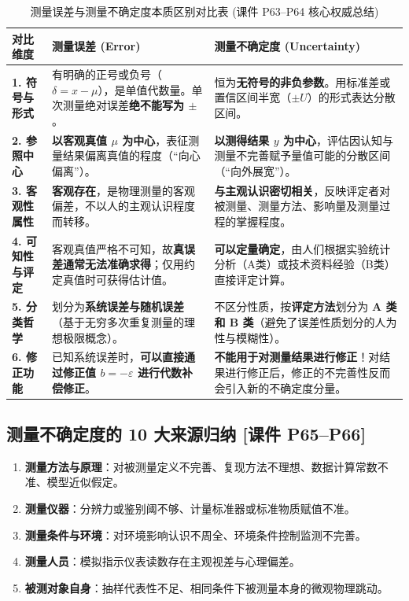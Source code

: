 \documentclass[11pt,a4paper]{ctexart}
\begin{document}
\begin{table}[htbp]
\centering
\small
\renewcommand{\arraystretch}{1.4}
\begin{tabularx}{\textwidth}{p{2.6cm}Xp{6.2cm}}
\toprule
\textbf{对比维度} & \textbf{测量误差 (Error)} & \textbf{测量不确定度 (Uncertainty)} \\
\midrule
\textbf{1. 符号与形式} & 有明确的正号或负号（$\delta = x - \mu$），是单值代数量。单次测量绝对误差\textbf{绝不能写为 $\pm$}。 & 恒为\textbf{无符号的非负参数}。用标准差或置信区间半宽（$\pm U$）的形式表达分散区间。 \\
\midrule
\textbf{2. 参照中心} & \textbf{以客观真值 $\mu$ 为中心}，表征测量结果偏离真值的程度（“向心偏离”）。 & \textbf{以测得结果 $y$ 为中心}，评估因认知与测量不完善赋予量值可能的分散区间（“向外展宽”）。 \\
\midrule
\textbf{3. 客观性属性} & \textbf{客观存在}，是物理测量的客观偏差，不以人的主观认识程度而转移。 & \textbf{与主观认识密切相关}，反映评定者对被测量、测量方法、影响量及测量过程的掌握程度。 \\
\midrule
\textbf{4. 可知性与评定} & 客观真值严格不可知，故\textbf{真误差通常无法准确求得}；仅用约定真值时可获得估计值。 & \textbf{可以定量确定}，由人们根据实验统计分析（A类）或技术资料经验（B类）直接评定计算。 \\
\midrule
\textbf{5. 分类哲学} & 划分为\textbf{系统误差与随机误差}（基于无穷多次重复测量的理想极限概念）。 & 不区分性质，按\textbf{评定方法}划分为 \textbf{A 类和 B 类}（避免了误差性质划分的人为性与模糊性）。 \\
\midrule
\textbf{6. 修正功能} & 已知系统误差时，\textbf{可以直接通过修正值 $b = -\varepsilon$ 进行代数补偿修正}。 & \textbf{不能用于对测量结果进行修正}！对结果进行修正后，修正的不完善性反而会引入新的不确定度分量。 \\
\bottomrule
\end{tabularx}
\caption{测量误差与测量不确定度本质区别对比表 (课件 P63--P64 核心权威总结)}
\label{tab:error_vs_uncertainty}
\end{table}

\subsection{测量不确定度的 10 大来源归纳 \textnormal{[课件 P65--P66]}}
\begin{enumerate}
    \item \textbf{测量方法与原理}：对被测量定义不完善、复现方法不理想、数据计算常数不准、模型近似假定。
    \item \textbf{测量仪器}：分辨力或鉴别阈不够、计量标准器或标准物质赋值不准。
    \item \textbf{测量条件与环境}：对环境影响认识不周全、环境条件控制监测不完善。
    \item \textbf{测量人员}：模拟指示仪表读数存在主观视差与心理偏差。
    \item \textbf{被测对象自身}：抽样代表性不足、相同条件下被测量本身的微观物理跳动。
\end{enumerate}
\end{document}
